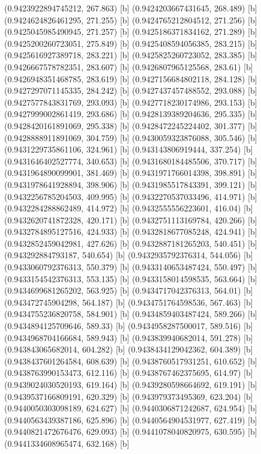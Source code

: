 {{{(0.9423922894745212, 267.863) [b] 
(0.9424203667431645, 268.489) [b] 
(0.9424624826461295, 271.255) [b] 
(0.9424765212804512, 271.256) [b] 
(0.9425045985490945, 271.257) [b] 
(0.9425186371834162, 271.289) [b] 
(0.9425200260723051, 275.849) [b] 
(0.9425408594056385, 283.215) [b] 
(0.9425616927389718, 283.221) [b] 
(0.9425825260723052, 283.385) [b] 
(0.9426667578782351, 283.607) [b] 
(0.9426807965125568, 283.61) [b] 
(0.9426948351468785, 283.619) [b] 
(0.9427156684802118, 284.128) [b] 
(0.9427297071145335, 284.242) [b] 
(0.9427437457488552, 293.088) [b] 
(0.9427577843831769, 293.093) [b] 
(0.9427718230174986, 293.153) [b] 
(0.9427999002861419, 293.686) [b] 
(0.9428139389204636, 295.335) [b] 
(0.9428420161891069, 295.338) [b] 
(0.9428472245224402, 301.377) [b] 
(0.9428888911891069, 304.759) [b] 
(0.9430059323876088, 305.546) [b] 
(0.9431229735861106, 324.961) [b] 
(0.943143806919444, 337.254) [b] 
(0.9431646402527774, 340.653) [b] 
(0.9431680184485506, 370.717) [b] 
(0.9431964890099901, 381.469) [b] 
(0.9431971766014398, 398.891) [b] 
(0.9431978641928894, 398.906) [b] 
(0.9431985517843391, 399.121) [b] 
(0.9432256785204503, 409.995) [b] 
(0.9432270537033496, 414.971) [b] 
(0.9432284288862489, 414.972) [b] 
(0.9432555556223601, 416.04) [b] 
(0.9432620741872328, 420.171) [b] 
(0.9432751113169784, 420.266) [b] 
(0.9432784895127516, 424.933) [b] 
(0.9432818677085248, 424.941) [b] 
(0.9432852459042981, 427.626) [b] 
(0.9432887181265203, 540.451) [b] 
(0.943292884793187, 540.654) [b] 
(0.9432935792376314, 544.056) [b] 
(0.9433060792376313, 550.379) [b] 
(0.9433140653487424, 550.497) [b] 
(0.9433154542376313, 553.135) [b] 
(0.9433158014598535, 563.664) [b] 
(0.9434699681265202, 563.925) [b] 
(0.9434717042376313, 564.01) [b] 
(0.943472745904298, 564.187) [b] 
(0.9434751764598536, 567.463) [b] 
(0.9434755236820758, 584.901) [b] 
(0.9434859403487424, 589.266) [b] 
(0.9434894125709646, 589.33) [b] 
(0.9434958287500017, 589.516) [b] 
(0.9434968704166684, 589.943) [b] 
(0.943839940682014, 591.278) [b] 
(0.943843065682014, 604.282) [b] 
(0.9438434129042362, 604.389) [b] 
(0.9438437601264584, 608.639) [b] 
(0.9438760517931251, 610.652) [b] 
(0.9438763990153473, 612.116) [b] 
(0.9438767462375695, 614.97) [b] 
(0.9439024030520193, 619.164) [b] 
(0.9439280598664692, 619.191) [b] 
(0.9439537166809191, 620.329) [b] 
(0.943979373495369, 623.204) [b] 
(0.9440050303098189, 624.627) [b] 
(0.9440306871242687, 624.954) [b] 
(0.9440563439387186, 625.896) [b] 
(0.9440564904531977, 627.419) [b] 
(0.9440821472676476, 629.093) [b] 
(0.9441078040820975, 630.595) [b] 
(0.9441334608965474, 632.168) [b] 
}}}

